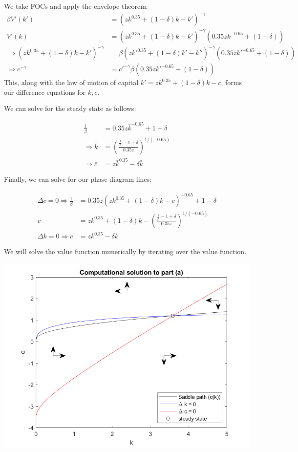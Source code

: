 \documentclass[11pt]{article} %
\begin{document}
We take FOCs and apply the envelope theorem:
\begin{align*}
\beta V'(k') &=(zk^{0.35} + (1-\delta)k - k')^{-\gamma} \\
V'(k) &= (zk^{0.35} + (1-\delta)k - k')^{-\gamma}(0.35zk^{-0.65} +(1-\delta)) \\
\Rightarrow (zk^{0.35} + (1-\delta)k - k')^{-\gamma} &= \beta (zk'^{0.35} + (1-\delta)k' - k'')^{-\gamma}(0.35zk'^{-0.65} +(1-\delta))\\
\Rightarrow c^{-\gamma} &= c'^{-\gamma} \beta(0.35zk'^{-0.65}+(1-\delta))
\end{align*}
This, along with the law of motion of capital $k' = zk^{0.35} +(1-\delta)k - c$, forms our difference equations for $k,c$.

We can solve for the steady state as follows:

\begin{align*}
\frac{1}{\beta} &= 0.35z\bar{k}^{-0.65} +1 - \delta\\
\Rightarrow \bar{k} &= \left(\frac{\frac{1}{\beta}-1+\delta}{0.35z}\right)^{1/(-0.65)}\\
\Rightarrow \bar{c} &= z\bar{k}^{0.35} - \delta \bar{k}
\end{align*}

Finally, we can solve for our phase diagram lines:

\begin{align*}
\Delta c= 0 \Rightarrow \frac{1}{\beta} &= 0.35z(zk^{0.35} + (1-\delta)k - c )^{-0.65} + 1 - \delta\\
c&= zk^{0.35} + (1-\delta)k -\left(\frac{\frac{1}{\beta} - 1 + \delta}{0.35 z}\right)^{1/(-0.65)}\\
\Delta k = 0 \Rightarrow c &= zk^{0.35} - \delta k
\end{align*}

We will solve the value function numerically by iterating over the value function.

\includegraphics{partA}
\end{document}
